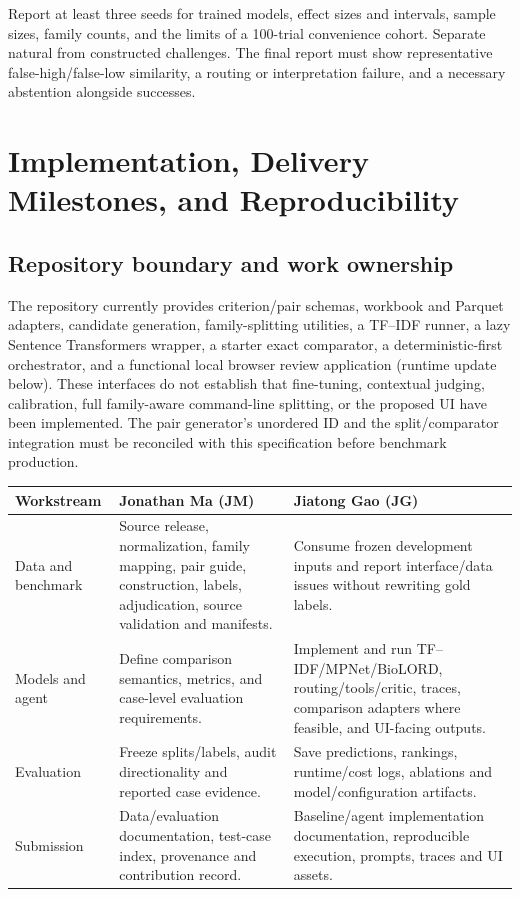 \documentclass[10pt,letterpaper]{article}
\begin{document}
Report at least three seeds for trained models, effect sizes and intervals,
sample sizes, family counts, and the limits of a 100-trial convenience cohort.
Separate natural from constructed challenges. The final report must show
representative false-high/false-low similarity, a routing or interpretation
failure, and a necessary abstention alongside successes.

\appendix
\section{Implementation, Delivery Milestones, and Reproducibility}
\label{sec:delivery}

\subsection{Repository boundary and work ownership}
The repository currently provides criterion/pair schemas, workbook and
Parquet adapters, candidate generation, family-splitting utilities, a TF--IDF
runner, a lazy Sentence Transformers wrapper, a starter exact comparator, a
deterministic-first orchestrator, and a functional local browser review application (runtime update below).
These interfaces do not establish that fine-tuning, contextual judging,
calibration, full family-aware command-line splitting, or the proposed UI
have been implemented. The pair generator's unordered ID and the
split/comparator integration must be reconciled with this specification
before benchmark production.

\begin{longtable}{L{.20\linewidth}L{.35\linewidth}L{.36\linewidth}}
\toprule Workstream & Jonathan Ma (JM) & Jiatong Gao (JG)\\\midrule
\endhead
Data and benchmark & Source release, normalization, family mapping, pair guide, construction, labels, adjudication, source validation and manifests. & Consume frozen development inputs and report interface/data issues without rewriting gold labels.\\
Models and agent & Define comparison semantics, metrics, and case-level evaluation requirements. & Implement and run TF--IDF/MPNet/BioLORD, routing/tools/critic, traces, comparison adapters where feasible, and UI-facing outputs.\\
Evaluation & Freeze splits/labels, audit directionality and reported case evidence. & Save predictions, rankings, runtime/cost logs, ablations and model/configuration artifacts.\\
Submission & Data/evaluation documentation, test-case index, provenance and contribution record. & Baseline/agent implementation documentation, reproducible execution, prompts, traces and UI assets.\\\bottomrule
\end{longtable}
\end{document}
